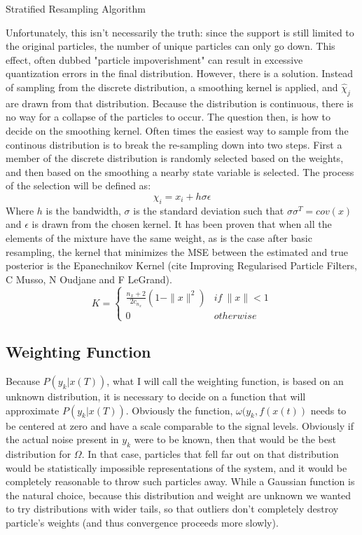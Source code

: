 \begin{algorithm}
\caption{Stratified Resampling Algorithm}
\begin{algorithmic}

\end{algorithmic}
\end{algorithm}

Unfortunately, this isn't necessarily the truth: since the support is
still limited to the original particles, the number of unique particles can only go down.
This effect, often dubbed "particle impoverishment" can result in excessive quantization
errors in the final distribution. However, there is a solution. Instead of sampling from the
discrete distribution, a smoothing kernel is applied, and $\hat{\chi}_j$ are drawn from
that distribution. Because the distribution is continuous, there is no way for a collapse
of the particles to occur. The question then, is how to decide on the smoothing kernel. 
Often times the easiest way to sample from the continous distribution is to break the 
re-sampling down into two steps. First a member of the discrete distribution is randomly
selected based on the weights, and then based on the smoothing a nearby state variable 
is selected. The process of the selection will be defined as:
\begin{equation}
\chi_i = x_i + h\sigma \epsilon
\end{equation}
Where $h$ is the bandwidth, $\sigma$ is the standard deviation such that $\sigma \sigma^T = cov(x)$
and $\epsilon$ is drawn from the chosen kernel.
It has been proven that when all the elements of the mixture
have the same weight, as is the case after basic resampling, the kernel that minimizes the 
MSE between the estimated and true posterior is the Epanechnikov Kernel (cite Improving Regularised
Particle Filters, C Musso, N Oudjane and F LeGrand). 
\begin{equation}
K = \left\{
\begin{array}{lr}
\frac{n_x+2}{2c_{n_x}}(1-\|x\|^2) & if\ \|x\| < 1\\
0 & otherwise
\end{array}\right.
\end{equation}

\subsection{Weighting Function}
Because $P(y_k | x(T))$, what I will call the weighting function,
is based on an unknown distribution, it is necessary to decide on a function
that will approximate $P(y_k | x(T))$. Obviously the function, $\omega(y_k, f(x(t))$
needs to be centered at zero and have a scale comparable to the signal levels.
Obviously if the actual noise present in $y_k$ were to be known, then that would
be the best distribution for $\Omega$. In that case, particles that fell
far out on that distribution would be statistically impossible representations
of the system, and it would be completely reasonable to throw such particles away.
While a Gaussian function is the natural choice, because this distribution
and weight are unknown we wanted to try distributions
with wider tails, so that outliers don't completely destroy particle's weights
(and thus convergence proceeds more slowly).

